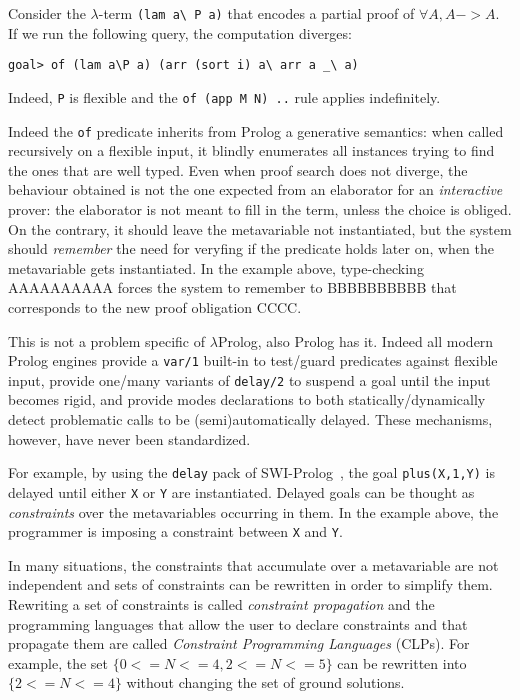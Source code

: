 \documentclass{easychair}
\begin{document}
Consider the $\lambda$-term \verb+(lam a\ P a)+ that encodes a
partial proof of $\forall A, A -> A$.
If we run the following query, the computation diverges:

\begin{verbatim}
goal> of (lam a\P a) (arr (sort i) a\ arr a _\ a)
\end{verbatim}

Indeed, \verb+P+ is flexible and the \verb+of (app M N) ..+
rule applies indefinitely.

Indeed the \verb+of+ predicate inherits from Prolog a generative semantics:
when called recursively on a flexible input, it blindly enumerates all
instances trying to find the ones that are well typed. Even when proof
search does not diverge, the behaviour obtained is not the one
expected from an elaborator for an \emph{interactive} prover: the
elaborator is not meant to fill in the term, unless the choice is
obliged. On the contrary, it should leave the metavariable not
instantiated, but the system should \emph{remember} the need for
veryfing if the predicate holds later on, when the metavariable gets
instantiated. In the example above, type-checking AAAAAAAAAA forces
the system to remember to BBBBBBBBBB that corresponds to the new proof
obligation CCCC.

This is not a problem specific of $\lambda$Prolog, also Prolog has it.
Indeed all modern Prolog engines provide a \verb+var/1+ built-in
to test/guard predicates against flexible input, provide one/many
variants of \verb+delay/2+ to suspend a goal until the input becomes rigid, and
provide modes declarations to both statically/dynamically detect problematic calls to be (semi)automatically delayed. These mechanisms, however, have never been standardized.

For example, by using the \verb+delay+ pack of SWI-Prolog~\cite{???}, the goal \verb+plus(X,1,Y)+ is delayed until either \verb+X+ or \verb+Y+ are instantiated.
Delayed goals can be thought as \emph{constraints} over the metavariables occurring in them. In the example above, the programmer is imposing a constraint between \verb+X+ and \verb+Y+.

In many situations, the constraints that accumulate over a metavariable are not independent and sets of constraints can be rewritten in order to simplify them. Rewriting a set of constraints is called \emph{constraint propagation} and the programming languages that allow the user to declare constraints and that propagate them are called \emph{Constraint Programming Languages} (CLPs). For example, the set $\{0 <= N <= 4, 2 <= N <= 5\}$ can be rewritten into $\{2 <= N <= 4\}$ without changing the set of ground solutions.
\end{document}
